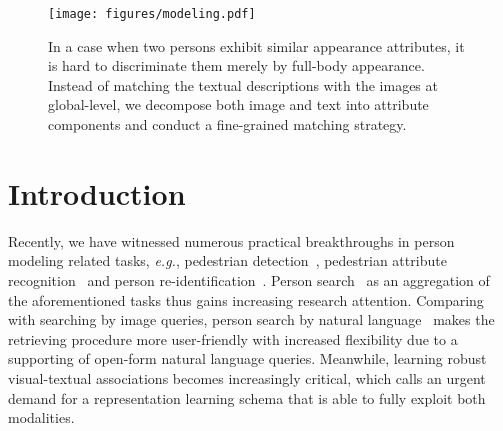 \documentclass[runningheads]{llncs}
\begin{document}
\begin{figure}[t]
\centering
\texttt{[image: figures/modeling.pdf]}
\caption{In a case when two persons exhibit similar appearance attributes, it is hard to discriminate them merely by full-body appearance. Instead of matching the textual descriptions with the images at global-level, we decompose both image and text into attribute components and conduct a fine-grained matching strategy.}
\label{fig:modeling}
\end{figure}

\section{Introduction}
Recently, we have witnessed numerous practical breakthroughs in person modeling related tasks, \textit{e.g.}, pedestrian detection~\cite{benenson2014ten,dollar2009pedestrian,wang2020resisting}, pedestrian attribute recognition~\cite{liu2017hydraplus,sudowe2015person} and
person re-identification~\cite{Gong:2014:PR:2584512,li2014deepreid,zheng2015scalable}. Person search~\cite{li2017person,han2019re} as an aggregation of the aforementioned tasks thus gains increasing research attention. Comparing with searching by image queries, person search by natural language~\cite{li2017person,li2017identity,Dong_2019_ICCV,ijcai2018-153} makes the retrieving procedure more user-friendly with increased flexibility due to a supporting of open-form natural language queries. Meanwhile, learning robust visual-textual associations becomes increasingly critical, which calls an urgent demand for a representation learning schema that is able to fully exploit both modalities.
\end{document}
